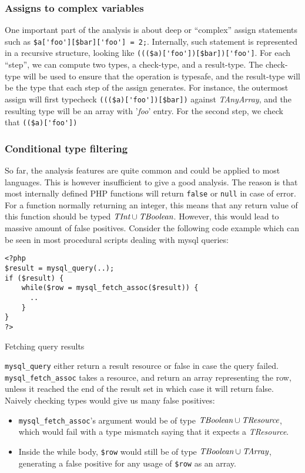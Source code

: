 \documentclass[a4paper]{article}
\begin{document}
\subsubsection{Assigns to complex variables}
One important part of the analysis is about deep or ``complex'' assign statements
such as \verb/$a['foo'][$bar]['foo'] = 2;/. Internally, such statement is represented
in a recursive structure, looking like \verb/((($a)['foo'])[$bar])['foo']/. For each
``step'', we can compute two types, a check-type, and a result-type. The check-type will
be used to ensure that the operation is typesafe, and the result-type will be the type that
each step of the assign generates. For instance, the outermost assign will first
typecheck \verb/((($a)['foo'])[$bar])/ against \emph{TAnyArray}, and the resulting
type will be an array with '\emph{foo}' entry. For the second step, we check that
\verb/(($a)['foo'])/ 

\subsubsection{Conditional type filtering}
So far, the analysis features are quite common and could be applied to most
languages. This is however insufficient to give a good analysis. The reason is
that most internally defined PHP functions will return \verb/false/ or
\verb/null/ in case of error. For a function normally returning an integer,
this means that any return value of this function should be typed
$\emph{TInt} \cup \emph{TBoolean}$. However, this would lead to massive amount of false
positives. Consider the following code example which can be seen in most
procedural scripts dealing with mysql queries:

\begin{listing}
  \begin{verbatim}
<?php
$result = mysql_query(..);
if ($result) {
    while($row = mysql_fetch_assoc($result)) {
      ..
    }
}
?>
  \end{verbatim}
  \caption{Fetching query results}
\end{listing}

\verb/mysql_query/ either return a result resource or false in case the query
failed. \verb/mysql_fetch_assoc/ takes a resource, and return an array
representing the row, unless it reached the end of the result set in which case
it will return false. Naively checking types would give us many false
positives:
\begin{itemize}
  \item \verb/mysql_fetch_assoc/'s argument would be of type
    $\emph{TBoolean} \cup \emph{TResource}$, which would fail with a type mismatch saying
    that it expects a \emph{TResource}.
  \item Inside the while body, \verb/$row/ would still be of type $\emph{TBoolean}
    \cup \emph{TArray}$, generating a false positive for any usage of \verb/$row/ as
    an array.
\end{itemize}
\end{document}
